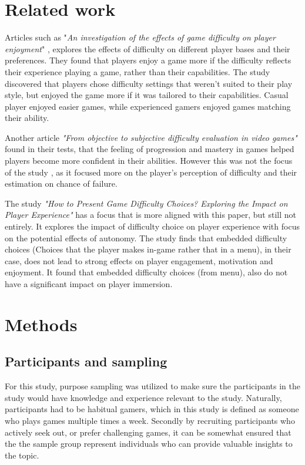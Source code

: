 \section{Related work}

Articles such as "\textit{An investigation of the effects of game difficulty on player enjoyment}" \cite{justin_t_alexander_investigation_2025}, explores the effects of difficulty on different player bases and their preferences. They found that players enjoy a game more if the difficulty reflects their experience playing a game, rather than their capabilities. The study discovered that players chose difficulty settings that weren't suited to their play style, but enjoyed the game more if it was tailored to their capabilities. Casual player enjoyed easier games, while experienced gamers enjoyed games matching their ability.

Another article \textit{"From objective to subjective difficulty evaluation in video games"}\cite{constant_objective_2017} found in their tests, that the feeling of progression and mastery in games helped players become more confident in their abilities. However this was not the focus of the study \cite{constant_objective_2017}, as it focused more on the player's perception of difficulty and their estimation on chance of failure. 

The study \textit{"How to Present Game Difficulty Choices? Exploring the Impact on Player Experience"} \cite{jan_d_smeddinck_how_2016} has a focus that is more aligned with this paper, but still not entirely. It explores the impact of difficulty choice on player experience with focus on the potential effects of autonomy. The study finds that embedded difficulty choices (Choices that the player makes in-game rather that in a menu), in their case, does not lead to strong effects on player engagement, motivation and enjoyment. It found that embedded difficulty choices (from menu), also do not have a significant impact on player immersion. 

\section{Methods}

\subsection{Participants and sampling}
For this study, purpose sampling was utilized to make sure the participants in the study would have knowledge and experience relevant to the study. Naturally, participants had to be habitual gamers, which in this study is defined as someone who plays games multiple times a week. Secondly by recruiting participants who actively seek out, or prefer challenging games, it can be somewhat ensured that the the sample group represent individuals who can provide valuable insights to the topic.

